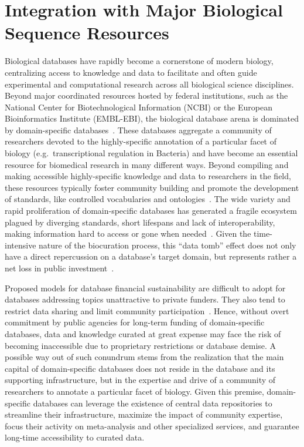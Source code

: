 \section{Integration with Major Biological Sequence Resources}

Biological databases have rapidly become a cornerstone of modern biology,
centralizing access to knowledge and data to facilitate and often guide
experimental and computational research across all biological science
disciplines. Beyond major coordinated resources hosted by federal institutions,
such as the National Center for Biotechnological Information (NCBI) or the
European Bioinformatics Institute (EMBL-EBI), the biological database arena is
dominated by domain-specific databases~\citep{chen2007online,
  chandras2009models, bolser2012metabase, galperin20152015}. These databases
aggregate a community of researchers devoted to the highly-specific annotation
of a particular facet of biology (e.g.\ transcriptional regulation in Bacteria)
and have become an essential resource for biomedical research in many different
ways. Beyond compiling and making accessible highly-specific knowledge and data
to researchers in the field, these resources typically foster community
building and promote the development of standards, like controlled vocabularies
and ontologies~\citep{howe2008big, dunin2006modomics, schindelman2011worm,
  costa2013drosophila}. The wide variety and rapid proliferation of
domain-specific databases has generated a fragile ecosystem plagued by
diverging standards, short lifespans and lack of interoperability, making
information hard to access or gone when needed~\citep{wren2008databases}. Given
the time-intensive nature of the biocuration process, this “data tomb” effect
does not only have a direct repercussion on a database’s target domain, but
represents rather a net loss in public investment~\citep{merali2005databases,
  howe2008big, bastow2010sustainable}.

Proposed models for database financial sustainability are difficult to adopt
for databases addressing topics unattractive to private funders. They also tend
to restrict data sharing and limit community
participation~\citep{chandras2009models, bastow2010sustainable}. Hence, without
overt commitment by public agencies for long-term funding of domain-specific
databases, data and knowledge curated at great expense may face the risk of
becoming inaccessible due to proprietary restrictions or database demise. A
possible way out of such conundrum stems from the realization that the main
capital of domain-specific databases does not reside in the database and its
supporting infrastructure, but in the expertise and drive of a community of
researchers to annotate a particular facet of biology. Given this premise,
domain-specific databases can leverage the existence of central data
repositories to streamline their infrastructure, maximize the impact of
community expertise, focus their activity on meta-analysis and other
specialized services, and guarantee long-time accessibility to curated data.


